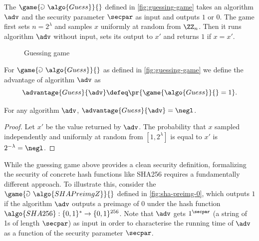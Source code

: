 The $\game{\Game~\algo{Guess}}{}$ defined in \autoref{fig:guessing-game} takes an algorithm $\adv$ and the security parameter $\secpar$ as input and outputs $1$ or $0$.
The game first sets $n = 2^\lambda$ and samples $x$ uniformly at random from $\ZZ_n$.
Then it runs algorithm $\adv$ without input, sets its output to $x'$ and returns $1$ if $x = x'$.

\begin{figure}[tbhp]
  \begin{center}
    \begin{tcolorbox}[width=3cm]
      \begin{pchstack}[center]
      \end{pchstack}
    \end{tcolorbox}
  \end{center}
  \caption{Guessing game\label{fig:guessing-game}}
\end{figure}

\begin{definition}
  For $\game{\Game~\algo{Guess}}{}$ as defined in \autoref{fig:guessing-game} we define the advantage of algorithm $\adv$ as
 \[
  \advantage{Guess}{\adv} \defeq \pr{\game{\algo{Guess}}{} = 1}.
 \]
\end{definition}

\begin{proposition}\label{prop:guessing-game}
  For any algorithm $\adv$, $\advantage{Guess}{\adv} = \negl$.
\end{proposition}

\begin{proof}
Let $x'$ be the value returned by $\adv$.
The probability that $x$ sampled independently and uniformly at random from $[1, 2^\lambda]$ is equal to $x'$ is $2^{-\lambda} = \negl$.
\end{proof}

While the guessing game above provides a clean security definition, formalizing the security of concrete hash functions like SHA256 requires a fundamentally different approach.
To illustrate this, consider the $\game{\Game~\algo{SHAPreimgZ}}{}$ defined in \autoref{fig:sha-preimg-0}, which outputs $1$ if the algorithm $\adv$ outputs a preimage of 0 under the hash function $\algo{SHA256}: \{0, 1\}^* \rightarrow \{0, 1\}^{256}$.
Note that $\adv$ gets $1^{\secpar}$ (a string of 1s of length $\secpar$) as input in order to characterise the running time of $\adv$ as a function of the security parameter $\secpar$.

